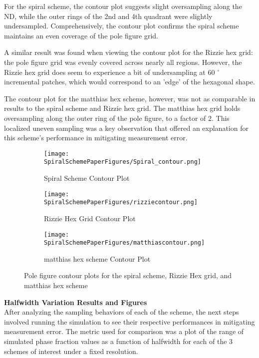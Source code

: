 \documentclass{article}
\begin{document}
For the spiral scheme, the contour plot suggests slight oversampling along the ND, while the outer rings of the 2nd and 4th quadrant were slightly undersampled. Comprehensively, the contour plot confirms the spiral scheme maintains an even coverage of the pole figure grid.

A similar result was found when viewing the contour plot for the Rizzie hex grid: the pole figure grid was evenly covered across nearly all regions. However, the Rizzie hex grid does seem to experience a bit of undersampling at 60 $^\circ$ incremental patches, which would correspond to an 'edge' of the hexagonal shape.

The contour plot for the matthias hex scheme, however, was not as comparable in results to the spiral scheme and Rizzie hex grid. The matthias hex grid holds oversampling along the outer ring of the pole figure, to a factor of 2. This localized uneven sampling was a key observation that offered an explanation for this scheme's performance in mitigating measurement error.

\begin{figure}[H]
\begin{subfigure}{.5\textwidth}
  \centering
  \texttt{[image: SpiralSchemePaperFigures/Spiral\_contour.png]}
  \caption{Spiral Scheme Contour Plot}
  \label{fig:sfig1}
\end{subfigure}%
\begin{subfigure}{.5\textwidth}
  \centering
  \texttt{[image: SpiralSchemePaperFigures/rizziecontour.png]}
  \caption{Rizzie Hex Grid Contour Plot}
  \label{fig:sfig2}
\end{subfigure}
\begin{subfigure}{\textwidth}
  \centering
  \texttt{[image: SpiralSchemePaperFigures/matthiascontour.png]}
  \caption{matthias hex scheme Contour Plot}
  \label{fig:sfig3}
\end{subfigure}
\caption{Pole figure contour plots for the spiral scheme, Rizzie Hex grid, and matthias hex scheme}
\label{fig:fig}
\end{figure}

\textbf{Halfwidth Variation Results and Figures}\\

After analyzing the sampling behaviors of each of the scheme, the next steps involved running the simulation to see their respective performances in mitigating measurement error. The metric used for comparison was a plot of the range of simulated phase fraction values as a function of halfwidth for each of the 3 schemes of interest under a fixed resolution.
\end{document}
